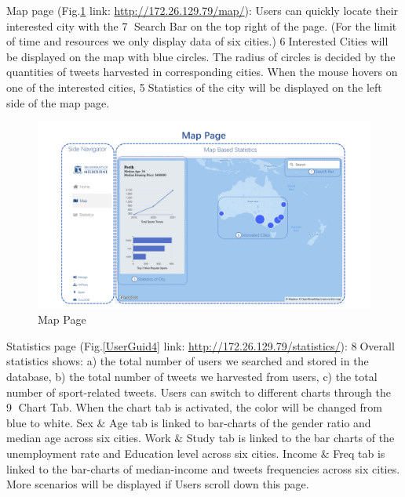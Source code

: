 Map page (Fig.\ref{UserGuid3} link: \url{http://172.26.129.79/map/}): Users can quickly locate their interested city with the \textcircled{7} Search Bar on the top right of the page. (For the limit of time and resources we only display data of six cities.) \textcircled{6}Interested Cities will be displayed on the map with blue circles. The radius of circles is decided by the quantities of tweets harvested in corresponding cities. When the mouse hovers on one of the interested cities, \textcircled{5}Statistics of the city will be displayed on the left side of the map page.

\begin{figure}
\centerline{\includegraphics[width=7in]{Figures/UserGuide3.JPG}}
\caption{Map Page}
\label{UserGuid3}
\end{figure}

Statistics page (Fig.\ref{UserGuid4} link: \url{http://172.26.129.79/statistics/}): \textcircled{8}Overall statistics shows: a) the total number of users we searched and stored in the database, b) the total number of tweets we harvested from users, c) the total number of sport-related tweets. Users can switch to different charts through the \textcircled{9} Chart Tab. When the chart tab is activated, the color will be changed from blue to white. Sex $\&$ Age tab is linked to bar-charts of the gender ratio and median age across six cities. Work $\&$ Study tab is linked to the bar charts of the unemployment rate and Education level across six cities. Income $\&$ Freq tab is linked to the bar-charts of median-income and tweets frequencies across six cities. More scenarios will be displayed if Users scroll down this page.

